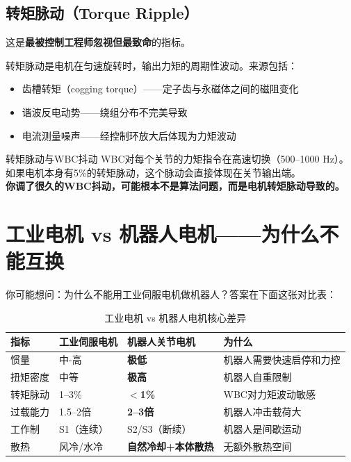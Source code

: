 \subsection{转矩脉动（Torque Ripple）}

这是\textbf{最被控制工程师忽视但最致命}的指标。

转矩脉动是电机在匀速旋转时，输出力矩的周期性波动。来源包括：

\begin{itemize}
  \item 齿槽转矩（cogging torque）——定子齿与永磁体之间的磁阻变化
  \item 谐波反电动势——绕组分布不完美导致
  \item 电流测量噪声——经控制环放大后体现为力矩波动
\end{itemize}

\begin{cautionbox}{转矩脉动与WBC抖动}
WBC对每个关节的力矩指令在高速切换（500--1000 Hz）。\\
如果电机本身有5\%的转矩脉动，这个脉动会直接体现在关节输出端。\\
\textbf{你调了很久的WBC抖动，可能根本不是算法问题，而是电机转矩脉动导致的。}
\end{cautionbox}

\section{工业电机 vs 机器人电机——为什么不能互换}

你可能想问：为什么不能用工业伺服电机做机器人？答案在下面这张对比表：

\begin{table}[H]
\centering
\begin{tabular}{lp{4cm}p{4cm}p{4cm}}
\toprule
\textbf{指标} & \textbf{工业伺服电机} & \textbf{机器人关节电机} & \textbf{为什么} \\
\midrule
惯量 & 中-高 & \textbf{极低} & 机器人需要快速启停和力控 \\
扭矩密度 & 中等 & \textbf{极高} & 机器人自重限制 \\
转矩脉动 & 1--3\% & \textbf{$<$1\%} & WBC对力矩波动敏感 \\
过载能力 & 1.5--2倍 & \textbf{2--3倍} & 机器人冲击载荷大 \\
工作制 & S1（连续） & S2/S3（断续） & 机器人是间歇运动 \\
散热 & 风冷/水冷 & \textbf{自然冷却+本体散热} & 无额外散热空间 \\
\bottomrule
\end{tabular}
\caption{工业电机 vs 机器人电机核心差异}
\label{tab:ind_vs_robot}
\end{table}

